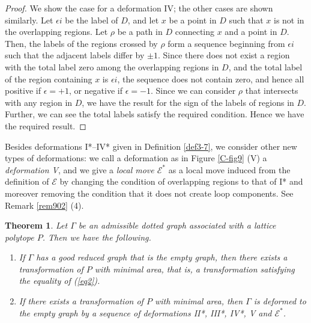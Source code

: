 \documentclass[a4paper,11pt]{amsart}
\numberwithin{equation}{section}
\newtheorem{theorem}{Theorem}[section]
\begin{document}
\begin{proof}
We show the case for a deformation IV; the other cases are shown similarly. 
Let $\epsilon i$ be the label of $D$, and let $x$ be a point in $D$ such that $x$ is not in the overlapping regions. 
Let $\rho$ be a path in $D$ connecting $x$ and a point in $D$. Then, the labels of the regions crossed by $\rho$ form a sequence beginning from $\epsilon i$ such that the adjacent labels differ by $\pm 1$. Since there does not exist a region with the total label zero among the overlapping regions in $D$, and the total label of the region containing $x$ is $\epsilon i$, the sequence does not contain zero, and hence all positive if $\epsilon=+1$, or negative if $\epsilon=-1$. 
Since we can consider $\rho$ that intersects with any region in $D$, we have the result for the sign of the labels of regions in $D$. 
Further, we can see the total labels satisfy the required condition. 
Hence we have the required result. 
\end{proof}

Besides deformations I*--IV* given in Definition \ref{def3-7},  we consider other new types of deformations: we call a deformation as in Figure \ref{C-fig9} (V) a {\it deformation V}, and we give a {\it local move $\mathcal{E}^*$} as a local move induced from the definition of $\mathcal{E}$ by changing the condition of overlapping regions to that of I* and moreover removing the condition that it does not create loop components.   
See Remark \ref{rem902} (4). 



\begin{theorem}\label{thm3-7}
Let $\Gamma$ be an admissible dotted graph associated with a lattice polytope $P$. 
Then we have the following. 
\begin{enumerate}[$(1)$]


\item
If $\Gamma$ has a good reduced graph that is the empty graph, then there exists a transformation of $P$ with minimal area, that is, a transformation satisfying the equality of (\ref{eq2}). 

\item
If there exists a transformation of $P$ with minimal area, then $\Gamma$ is deformed to the empty graph by a sequence of deformations II*, III*, IV*, V and $\mathcal{E}^*$.  

\end{enumerate}
\end{theorem}
\end{document}
